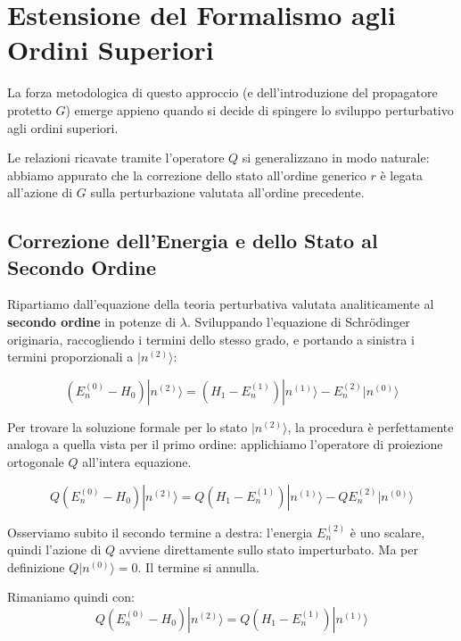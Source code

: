 \section{Estensione del Formalismo agli Ordini Superiori}

La forza metodologica di questo approccio (e dell'introduzione del propagatore protetto $G$) emerge appieno quando si decide di spingere lo sviluppo perturbativo agli ordini superiori.

Le relazioni ricavate tramite l'operatore $Q$ si generalizzano in modo naturale: abbiamo appurato che la correzione dello stato all'ordine generico $r$ è legata all'azione di $G$ sulla perturbazione valutata all'ordine precedente.

\subsection{Correzione dell'Energia e dello Stato al Secondo Ordine}

Ripartiamo dall'equazione della teoria perturbativa valutata analiticamente al \textbf{secondo ordine} in potenze di $\lambda$. Sviluppando l'equazione di Schrödinger originaria, raccogliendo i termini dello stesso grado, e portando a sinistra i termini proporzionali a $\vert{}n^{(2)}\rangle$:

\begin{equation}
(E_n^{(0)} - H_0) |n^{(2)}\rangle = (H_1 - E_n^{(1)}) |n^{(1)}\rangle - E_n^{(2)} |n^{(0)}\rangle
\end{equation}

Per trovare la soluzione formale per lo stato $\vert{}n^{(2)}\rangle$, la procedura è perfettamente analoga a quella vista per il primo ordine: applichiamo l'operatore di proiezione ortogonale $Q$ all'intera equazione.

\begin{equation}
Q (E_n^{(0)} - H_0) |n^{(2)}\rangle = Q (H_1 - E_n^{(1)}) |n^{(1)}\rangle - Q E_n^{(2)} |n^{(0)}\rangle
\end{equation}

Osserviamo subito il secondo termine a destra: l'energia $E_n^{(2)}$ è uno scalare, quindi l'azione di $Q$ avviene direttamente sullo stato imperturbato. Ma per definizione $Q \vert{}n^{(0)}\rangle = 0$. Il termine si annulla.

Rimaniamo quindi con:
\begin{equation}
Q (E_n^{(0)} - H_0) |n^{(2)}\rangle = Q (H_1 - E_n^{(1)}) |n^{(1)}\rangle
\end{equation}

